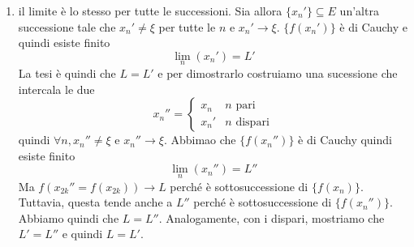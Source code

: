 \documentclass[a4paper]{article}
\begin{document}
{{\begin{enumerate}
            Per ipotesi, \(x_n \in E\) e \(x_n \neq \xi\) per tutte le \(n\)
            e \(x_n \to \xi\) quindi esiste \(N\) tale che \(\forall n \geq N, x_n \in (J \cap E) \backslash \{\xi\}\).
            Quindi \(\forall n,m \geq N\), \(x_n,x_m \in (J \cap E) \backslash \{\xi\}\)
            da cui \(|f(x_n) - f(x_m)| < \varepsilon\) come si voleva;
            \item il limite è lo stesso per tutte le successioni.
            Sia allora \(\{x_n'\} \subseteq E\) un'altra successione tale che
            \(x_n' \neq \xi\) per tutte le \(n\) e \(x_n' \to \xi\).
            \(\{f(x_n')\}\) è di Cauchy e quindi esiste finito
            \[
                \lim_n(x_n') = L'
            \]
            La tesi è quindi che \(L=L'\) e per dimostrarlo costruiamo
            una sucessione che intercala le due
            \[
                x_n'' = \begin{cases}
                    x_n & n \text{ pari} \\
                    x_n' & n \text{ dispari}
                \end{cases}
            \]
            quindi \(\forall n,x_n'' \neq \xi\) e \(x_n'' \to \xi\).
            Abbimao che \(\{f(x_n'')\}\) è di Cauchy quindi esiste finito
            \[
                \lim_n(x_n'') = L''
            \]
            Ma \(f(x_{2k}'' = f(x_{2k})) \to L\) perché è sottosuccessione di \(\{f(x_n)\}\).
            Tuttavia, questa tende anche a \(L''\) perché è sottosuccessione di \(\{f(x_n'')\}\).
            Abbiamo quindi che \(L=L''\).
            Analogamente, con i dispari, mostriamo che \(L'=L''\)
            e quindi \(L=L'\).
        \end{enumerate}

    }
}

\pagebreak

\end{document}
